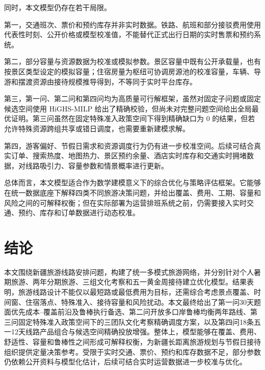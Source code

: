 \documentclass[UTF8,zihao=-4,a4paper]{ctexart}
\begin{document}
同时，本文模型仍存在若干局限。

第一，交通班次、票价和预约库存并非实时数据。铁路、航班和部分接驳费用使用代表性时刻、公开价格或模型校准值，不能替代正式出行日期的实时售票和预约系统。

第二，部分容量与资源数据为校准或模拟参数。景区容量中既有公开承载量，也有按景区类型设定的模拟容量；住宿房量为枢纽可协调房源池的校准容量，车辆、导游和摆渡资源由接待规模推导得到，不等同于实时平台库存。

第三，第一问、第二问和第四问均为高质量可行解框架，虽然对固定子问题或固定候选空间使用 HiGHS-MILP 给出了精确校验，但尚未对完整问题空间给出全局最优证明。第三问虽然在固定特殊准入政策空间下得到精确缺口为 $0$ 的结果，但若允许特殊资源跨组共享或错日调度，也需要重新建模求解。

第四，游客偏好、节假日需求和资源调度行为仍有进一步校准空间。后续可结合真实订单、搜索热度、地图热力、景区预约余量、酒店实时库存和交通实时拥堵数据，对线路吸引力、容量参数和情景概率进行更新。

总体而言，本文模型适合作为数学建模意义下的综合优化与策略评估框架。它能够在统一数据底座下解释四类不同旅游决策问题，并给出覆盖、费用、工期、容量和风险之间的可解释权衡；但在实际部署为运营排班系统之前，仍需要接入实时交通、预约、库存和订单数据进行动态校准。

\section{结论}
\label{sec:conclusion}

本文围绕新疆旅游线路安排问题，构建了统一多模式旅游网络，并分别针对个人暑期旅游、两年分期旅游、三组文化考察和五一黄金周接待建立优化模型。结果表明，旅游线路设计不能仅以最短路或最低费用为目标，还需综合考虑景点覆盖、时间窗、住宿落点、特殊准入、接待容量和风险扰动。本文最终给出了第一问30天题面优先成本--覆盖前沿及鲁棒执行备选、第二问开放多口岸鲁棒均衡两年路线、第三问固定特殊准入政策空间下的三团队文化考察精确调度方案，以及第四问18条五一12天线路产品组合与候选空间精确投放增强。整体上，模型能够在覆盖、费用、舒适性、容量和鲁棒性之间形成可解释权衡，为新疆长距离旅游规划与节假日接待组织提供定量决策参考。受限于实时交通、票价、预约和库存数据不足，部分参数仍依赖公开资料与模型化估计，后续可结合实时运营数据进一步校准与优化。
\end{document}
